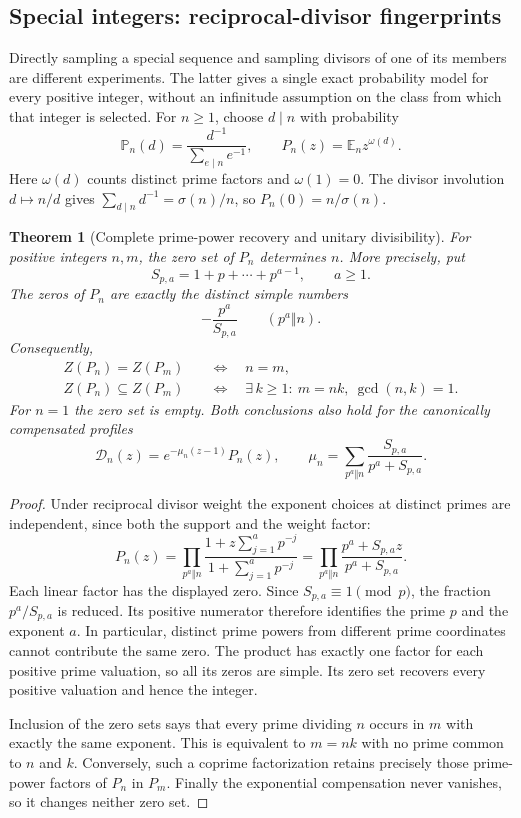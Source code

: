 \documentclass[11pt]{article}
\newtheorem{theorem}{Theorem}[section]
\theoremstyle{definition}
\begin{document}
\subsection{Special integers: reciprocal-divisor fingerprints}

Directly sampling a special sequence and sampling divisors of one of
its members are different experiments. The latter gives a single exact
probability model for every positive integer, without an infinitude
assumption on the class from which that integer is selected.
For $n\ge1$, choose $d\mid n$ with probability
\[
 {\mathbb P}_n(d)=
 \frac{d^{-1}}{\sum_{e\mid n}e^{-1}},\qquad
 P_n(z)={\mathbb E}_n z^{\omega(d)}.
\]
Here $\omega(d)$ counts distinct prime factors and $\omega(1)=0$.
The divisor involution $d\mapsto n/d$ gives
$\sum_{d\mid n}d^{-1}=\sigma(n)/n$, so $P_n(0)=n/\sigma(n)$.

\begin{theorem}[Complete prime-power recovery and unitary divisibility]
\label{thm:divisor-profile-unitary}
For positive integers $n,m$, the zero set of $P_n$ determines $n$.
More precisely, put
\[
 S_{p,a}=1+p+\cdots+p^{a-1},\qquad a\ge1.
\]
The zeros of $P_n$ are exactly the distinct simple numbers
\[
 -\frac{p^a}{S_{p,a}}\qquad(p^a\Vert n).
\]
Consequently,
\[
 \begin{split}
 Z(P_n)=Z(P_m)&\quad\Longleftrightarrow\quad n=m,\\
 Z(P_n)\subseteq Z(P_m)&\quad\Longleftrightarrow\quad
 \exists\,k\ge1:\ m=nk,\ \gcd(n,k)=1.
 \end{split}
\]
For $n=1$ the zero set is empty. Both conclusions also hold for
the canonically compensated profiles
\[
 \mathcal D_n(z)=e^{-\mu_n(z-1)}P_n(z),\qquad
 \mu_n=\sum_{p^a\Vert n}\frac{S_{p,a}}{p^a+S_{p,a}}.
\]
\end{theorem}

\begin{proof}
Under reciprocal divisor weight the exponent choices at distinct
primes are independent, since both the support and the weight factor:
\[
 P_n(z)=
 \prod_{p^a\Vert n}
 \frac{1+z\sum_{j=1}^{a}p^{-j}}
      {1+\sum_{j=1}^{a}p^{-j}}
 =
 \prod_{p^a\Vert n}
 \frac{p^a+S_{p,a}z}{p^a+S_{p,a}}.
\]
Each linear factor has the displayed zero.
Since $S_{p,a}\equiv1\pmod p$, the fraction $p^a/S_{p,a}$
is reduced. Its positive numerator therefore identifies the prime
$p$ and the exponent $a$. In particular, distinct prime powers from
different prime coordinates cannot contribute the same zero.
The product has exactly one factor for each positive prime valuation,
so all its zeros are simple. Its zero set recovers every positive
valuation and hence the integer.

Inclusion of the zero sets says that every prime dividing $n$
occurs in $m$ with exactly the same exponent. This is equivalent to
$m=nk$ with no prime common to $n$ and $k$. Conversely, such a
coprime factorization retains precisely those prime-power factors
of $P_n$ in $P_m$. Finally the exponential compensation never
vanishes, so it changes neither zero set.
\end{proof}
\end{document}
